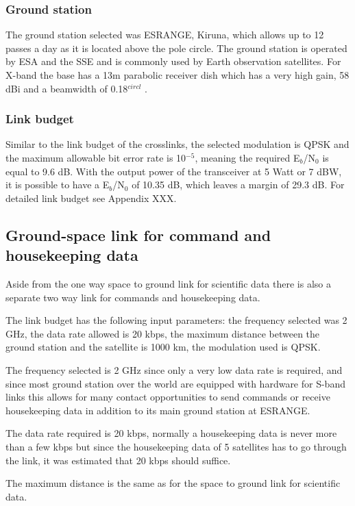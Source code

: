 \subsubsection{Ground station}
The ground station selected was ESRANGE, Kiruna, which allows up to 12 passes a day as it is located above the pole circle. The ground station is operated by ESA and the SSE and is commonly used by Earth observation satellites. For X-band the base has a 13m parabolic receiver dish which has a very high gain, 58 dBi and a beamwidth of 0.18$^{circl}$ \cite{esrange}.

\subsubsection{Link budget}

Similar to the link budget of the crosslinks, the selected modulation is QPSK and the maximum allowable bit error rate is 10$^{-5}$, meaning the required E$_{b}$/N$_{0}$ is equal to 9.6 dB. With the output power of the transceiver at 5 Watt or 7 dBW, it is possible to have a E$_{b}$/N$_{0}$ of 10.35 dB, which leaves a margin of 29.3 dB. For detailed link budget see Appendix XXX.

\subsection{Ground-space link for command and housekeeping data}
Aside from the one way space to ground link for scientific data there is also a separate two way link for commands and housekeeping data. 

The link budget has the following input parameters: the frequency selected was 2 GHz, the data rate allowed is 20 kbps, the maximum distance between the ground station and the satellite is 1000 km, the modulation used is QPSK.

The frequency selected is 2 GHz since only a very low data rate is required, and since most ground station over the world are equipped with hardware for S-band links this allows for many contact opportunities to send commands or receive housekeeping data in addition to its main ground station at ESRANGE.

The data rate required is 20 kbps, normally a housekeeping data is never more than a few kbps\cite{satcom} but since the housekeeping data of 5 satellites has to go through the link, it was estimated that 20 kbps should suffice.

The maximum distance is the same as for the space to ground link for scientific data.

